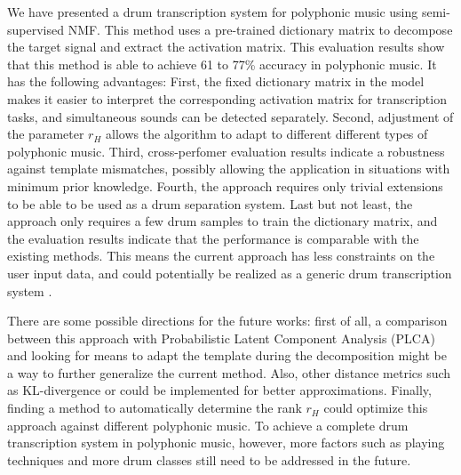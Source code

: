 \documentclass{article}
\begin{document}
We have presented a drum transcription system for polyphonic music using semi-supervised NMF. This method uses a pre-trained dictionary matrix to decompose the target signal and extract the activation matrix. This evaluation results show that this method is able to achieve 61 to 77\% accuracy in polyphonic music. 
It has the following advantages: 
First, the fixed dictionary matrix in the model makes it easier to interpret the corresponding activation matrix for transcription tasks, and simultaneous sounds can be detected separately. 
Second, adjustment of the parameter $r_H$ allows the algorithm to adapt to different different types of polyphonic music. 
Third, cross-perfomer evaluation results indicate a robustness against template mismatches, possibly allowing the application in situations with minimum prior knowledge. %
Fourth, the approach requires only trivial extensions to be able to be used as a drum separation system.
Last but not least, the approach only requires a few drum samples to train the dictionary matrix, and the evaluation results indicate that the performance is comparable with the existing methods. This means the current approach has less constraints on the user input data, and could potentially be realized as a generic drum transcription system .

There are some possible directions for the future works: first of all, a comparison between this approach with Probabilistic Latent Component Analysis (PLCA) and looking for means to adapt the template during the decomposition might be a way to further generalize the current method. Also, other distance metrics such as KL-divergence or could be implemented for better approximations. Finally, finding a method to automatically determine the rank $r_H$ could optimize this approach against different polyphonic music. To achieve a complete drum transcription system in polyphonic music, however, more factors such as playing techniques and more drum classes still need to be addressed in the future. 
\end{document}
